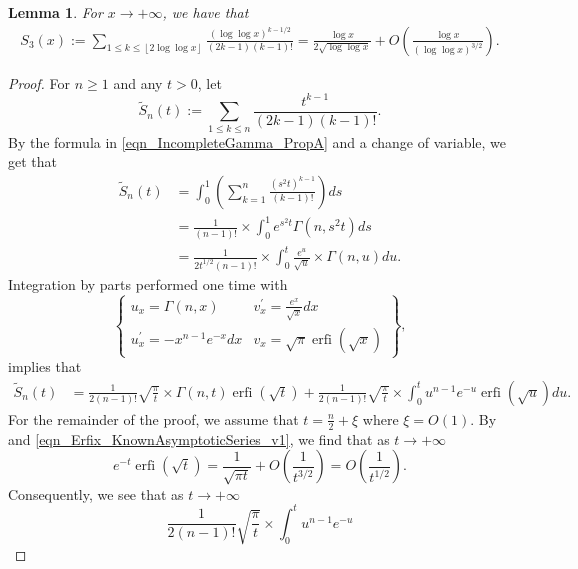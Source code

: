 \documentclass[11pt,reqno,a4letter]{article}
\numberwithin{figure}{section}
\numberwithin{table}{section}
\newcommand{\floor}[1]{\left\lfloor #1 \right\rfloor}
\theoremstyle{plain}
\newtheorem{lemma}[theorem]{Lemma}
\numberwithin{theorem}{section}
\theoremstyle{definition}
\begin{document}
\begin{lemma}
\label{lemma_ConvenientIncGammaFuncTypePartialSumAsymptotics_v3}
For $x \rightarrow +\infty$, we have that 
\begin{align*}
S_3(x) := \sum_{1 \leq k \leq \floor{2\log\log x}} \frac{(\log\log x)^{k-1/2}}{(2k-1) (k-1)!} = 
     \frac{\log x}{2\sqrt{\log\log x}} + O\left(\frac{\log x}{(\log\log x)^{3/2}}\right).       
\end{align*}
\end{lemma}
\begin{proof}
For $n \geq 1$ and any $t > 0$, let 
\[
\widetilde{S}_n(t) := \sum_{1 \leq k \leq n} \frac{t^{k-1}}{(2k-1) (k-1)!}. 
\]
By the formula in \eqref{eqn_IncompleteGamma_PropA} and a change of variable, we get that 
\begin{align*}
\widetilde{S}_n(t) & = \int_0^1 \left(\sum_{k=1}^{n} \frac{(s^2t)^{k-1}}{(k-1)!}\right) ds \\ 
     & = \frac{1}{(n-1)!} \times \int_0^1 e^{s^2t} \Gamma(n, s^2t) ds \\ 
     & = \frac{1}{2t^{1/2}(n-1)!} \times \int_0^{t} \frac{e^{u}}{\sqrt{u}} \times \Gamma(n, u) du. 
\end{align*}
Integration by parts performed one time with 
\[
     \left\{\begin{array}{ll} 
     u_x = \Gamma(n, x) & v_x^{\prime} = \frac{e^{x}}{\sqrt{x}} dx \\ 
     u_x^{\prime} = -x^{n-1} e^{-x} dx & v_x = 
     \sqrt{\pi} \operatorname{erfi}\left(\sqrt{x}\right)
     \end{array} 
     \right\}, 
\]
implies that 
\begin{align}
\label{eqn_ProofTag_AppendixLastSumLemma_IBP_resulting_exp_terms_v1}
\widetilde{S}_n(t) & = 
     \frac{1}{2(n-1)!} \sqrt{\frac{\pi}{t}} \times \Gamma(n, t) \operatorname{erfi}\left(
     \sqrt{t}\right) + 
     \frac{1}{2(n-1)!} \sqrt{\frac{\pi}{t}} \times \int_0^{t} u^{n-1} e^{-u} 
     \operatorname{erfi}\left(\sqrt{u}\right) du. 
\end{align}
For the remainder of the proof, we assume that $t = \frac{n}{2} + \xi$ where $\xi = O(1)$. 
By \cite[Eq.\ (7.12.1)]{NISTHB} and \eqref{eqn_Erfix_KnownAsymptoticSeries_v1}, 
we find that as $t \rightarrow +\infty$ 
\[
e^{-t} \operatorname{erfi}\left(\sqrt{t}\right) = \frac{1}{\sqrt{\pi t}} + O\left(\frac{1}{t^{3/2}}\right) = 
     O\left(\frac{1}{t^{1/2}}\right). 
\]
Consequently, we see that as $t \rightarrow +\infty$ 
\[
\frac{1}{2(n-1)!} \sqrt{\frac{\pi}{t}} \times \int_0^{t} u^{n-1} e^{-u} 
\]
\end{proof}
\end{document}
